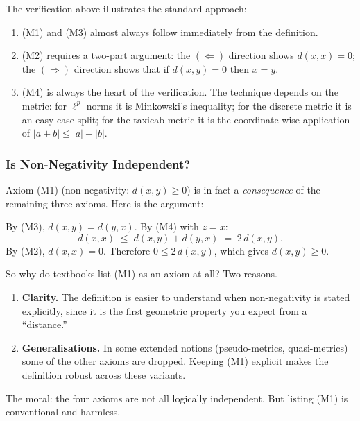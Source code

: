 \begin{remark*}
The verification above illustrates the standard approach:
\begin{enumerate}
  \item (M1) and (M3) almost always follow immediately from the definition.
  \item (M2) requires a two-part argument: the $(\Leftarrow)$ direction
        shows $d(x,x) = 0$; the $(\Rightarrow)$ direction shows that
        if $d(x,y) = 0$ then $x = y$.
  \item (M4) is always the heart of the verification. The technique depends
        on the metric: for $\ell^p$ norms it is Minkowski's inequality;
        for the discrete metric it is an easy case split;
        for the taxicab metric it is the coordinate-wise application of
        $|a + b| \le |a| + |b|$.
\end{enumerate}
\end{remark*}

\subsubsection{Is Non-Negativity Independent?}
\label{sec:nonneg-redundant}

\begin{remark*}
\label{rem:nonneg-redundant}
Axiom (M1) (non-negativity: $d(x,y) \ge 0$) is in fact a \emph{consequence}
of the remaining three axioms.
Here is the argument:

By (M3), $d(x,y) = d(y,x)$.
By (M4) with $z = x$:
\[
d(x, x) \;\le\; d(x, y) + d(y, x) \;=\; 2\,d(x, y).
\]
By (M2), $d(x, x) = 0$.
Therefore $0 \le 2\,d(x,y)$, which gives $d(x,y) \ge 0$.

\medskip\noindent
So why do textbooks list (M1) as an axiom at all?
Two reasons.

\begin{enumerate}
  \item \textbf{Clarity.} The definition is easier to understand
        when non-negativity is stated explicitly, since it is the first
        geometric property you expect from a ``distance.''
  \item \textbf{Generalisations.} In some extended notions (pseudo-metrics,
        quasi-metrics) some of the other axioms are dropped.
        Keeping (M1) explicit makes the definition robust across
        these variants.
\end{enumerate}

\noindent
The moral: the four axioms are not all logically independent.
But listing (M1) is conventional and harmless.
\end{remark*}

